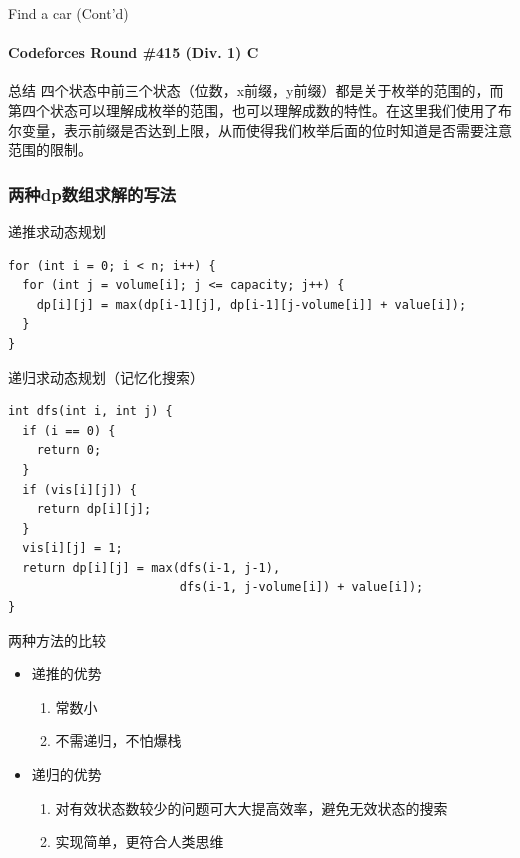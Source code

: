 \documentclass[hyperref={unicode=true}]{beamer}
\theoremstyle{definition}
\theoremstyle{proof}
\begin{document}
\begin{frame}{Find a car (Cont'd)}\framesubtitle{Codeforces Round \#415 (Div. 1) C}
  \begin{exampleblock}{总结}
    四个状态中前三个状态（位数，x前缀，y前缀）都是关于枚举的范围的，而第四个状态可以理解成枚举的范围，也可以理解成数的特性。在这里我们使用了布尔变量，表示前缀是否达到上限，从而使得我们枚举后面的位时知道是否需要注意范围的限制。
  \end{exampleblock}
\end{frame}

\subsubsection{两种dp数组求解的写法}
\begin{frame}[fragile]{递推求动态规划}
  \begin{verbatim}
for (int i = 0; i < n; i++) {
  for (int j = volume[i]; j <= capacity; j++) {
    dp[i][j] = max(dp[i-1][j], dp[i-1][j-volume[i]] + value[i]);
  }
}
  \end{verbatim}
\end{frame}

\begin{frame}[fragile]{递归求动态规划（记忆化搜索）}
  \begin{verbatim}
int dfs(int i, int j) {
  if (i == 0) {
    return 0;
  }
  if (vis[i][j]) {
    return dp[i][j];
  }
  vis[i][j] = 1;
  return dp[i][j] = max(dfs(i-1, j-1),
                        dfs(i-1, j-volume[i]) + value[i]);
}
  \end{verbatim}
\end{frame}
\begin{frame}{两种方法的比较}
  \begin{itemize}[<+->]
  \item 递推的优势
    \begin{enumerate}
    \item 常数小
    \item 不需递归，不怕爆栈
    \end{enumerate}
  \item 递归的优势
    \begin{enumerate}
    \item 对有效状态数较少的问题可大大提高效率，避免无效状态的搜索
    \item 实现简单，更符合人类思维
    \end{enumerate}
  \end{itemize}
\end{frame}
\end{document}
